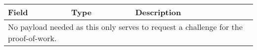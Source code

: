 \begin{tabularx}{.85\linewidth}{llX}
	\toprule
	Field & Type & Description
	\\
	\midrule
	\multicolumn{3}{l}{No payload needed as this only serves to request a challenge for the proof-of-work.}
	\\
	\bottomrule
\end{tabularx}
